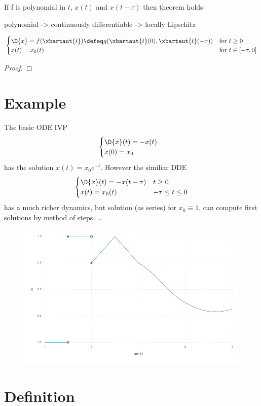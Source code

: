 \begin{corollary}
    \label{corollary}
    If f is polynomial in $t$, $x(t)$ and $x(t-\tau)$ then theorem holds

    polynomial -> continuously differentiable -> locally Lipschitz


\begin{equation}
    \begin{cases}
        \D{x}=f(\xbartaut{t})\defeq g(\xbartaut{t}(0),\xbartaut{t}(-\tau)) &\text{for } t\geq 0\\
        x(t)=x_0(t) & \text{for } t\in[-\tau,0]
    \end{cases}
\end{equation}
\end{corollary}

\begin{proof}

\end{proof}


\section{Example}\label{example}
The basic ODE IVP
\begin{equation}
    \begin{cases}
        \D{x}(t) = -x(t)\\
        x(0) = x_0
    \end{cases}
\end{equation}
has the solution $x(t)=x_0 e^{-t}$. However the similiar DDE
\begin{equation}
    \begin{cases}
        \D{x}(t) = -x(t-\tau) & t\geq 0\\
        x(t) = x_0(t) & -\tau\leq t\leq 0
    \end{cases}
\end{equation}
has a much richer dynamics, but solution (as series) for $x_0\equiv 1$, can compute first solutions by method of steps. \ldots{}

\begin{figure}[h]\centering
    \includegraphics[width=\textwidth]{figures/piecewise-initial-function.png}
	\label{fig:not-allowed}
\end{figure}

\section{Definition}\label{definition}
